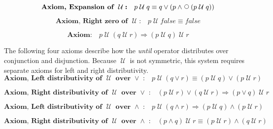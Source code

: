 \documentclass[fleqn, leqno]{article}
\newcommand{\impl}{\ensuremath{\Rightarrow}}        %
\newcommand{\Until}{\;\mathcal{U}\;}
\newcommand{\Next}{\;\,\text{\raisebox{3.5pt}{\circle{6}}}}
\newcommand{\firstspacer}{\vspace{-26pt}}
\begin{document}
\firstspacer

\begin{equation}\label{E:expansionUntil}
\textbf{Axiom, Expansion of $\Until$:}\quad p \Until q \equiv q \lor (p \land \Next (p \Until q))
\end{equation}

\firstspacer

\begin{equation}\label{E:untilFalse}
\textbf{Axiom, Right zero of $\Until$:}\quad p \Until false \equiv false
\end{equation}

\firstspacer

\begin{equation}\label{E:untilAssocImp}
\textbf{Axiom:}\quad p \Until (q \Until r) \impl (p \Until q) \Until r
\end{equation}

The following four axioms describe how the \textit{until} operator distributes over conjunction and disjunction.
Because $\Until$ is not symmetric, this system requires separate axioms for left and right distributivity.
\begin{equation}\label{E:untilOrEquiv}
\textbf{Axiom, Left distributivity of $\Until$ over $\lor$ :}\quad p \Until (q \lor r) \equiv (p \Until q) \lor (p \Until r)
\end{equation}

\firstspacer

\begin{equation}\label{E:untilOrImp}
\textbf{Axiom, Right distributivity of $\Until$ over $\lor$ :}\quad (p \Until r) \lor (q \Until r) \impl (p \lor q) \Until r
\end{equation}

\firstspacer

\begin{equation}\label{E:untilAndImp}
\textbf{Axiom, Left distributivity of $\Until$ over $\land$ :}\quad p \Until (q \land r) \impl (p \Until q) \land (p \Until r)
\end{equation}

\firstspacer

\begin{equation}\label{E:untilAndEquiv}
\textbf{Axiom, Right distributivity of $\Until$ over $\land$ :}\quad (p \land q) \Until r \equiv (p \Until r) \land (q \Until r)
\end{equation}
\end{document}
